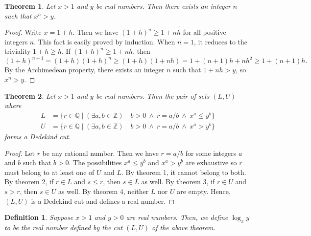 \documentclass[12pt]{article}
\newtheorem{dfn}{Definition}
\newtheorem{thm}{Theorem}
\begin{document}
\begin{thm}
Let $x>1$ and $y$ be real numbers.
Then there exists an integer $n$ such that $x^n > y$.
\end{thm}

\begin{proof}
Write $x = 1 + h$.  Then we have $(1 + h)^n \ge 1 + n h$ for all
positive integers $n$.  This fact is easily proved by induction.
When $n = 1$, it reduces to the triviality $1 + h \ge h$.  If
$(1 + h)^n \ge 1 + n h$, then
\[
(1 + h)^{n+1} = (1 + h) (1 + h)^n \ge (1 + h) (1 + n h) =
1 + (n+1) h + n h^2 \ge 1 + (n+1) h.
\]
By the Archimedean property, there exists an integer $n$ such
that $1 + nh > y$, so $x^n > y$.
\end{proof}

\begin{thm}
Let $x>1$ and $y$ be real numbers. 
Then the pair of sets $(L,U)$ where
\begin{align}
L &= \{r \in \mathbb{Q} \mid (\exists a, b \in \mathbb{Z}) \quad
b > 0 ~\land~ r = a/b ~\land~ x^a \le y^b\} \\
U &= \{r \in \mathbb{Q} \mid (\exists a, b \in \mathbb{Z}) \quad
b > 0 ~\land~ r = a/b ~\land~ x^a > y^b\}
\end{align}
forms a Dedekind cut.
\end{thm}

\begin{proof}
Let $r$ be any rational number.  Then we have $r = a/b$ for some integers
$a$ and $b$ such that $b > 0$.  The possibilities $x^a \le y^b$ and
$x^a > y^b$ are exhaustive so $r$ must belong to at least one of $U$ and
$L$.  By theorem 1, it cannot belong to both.  By theorem 2, if $r \in L$
and $s \le r$, then $s \in L$ as well.  By theorem 3, if $r \in U$
and $s > r$, then $s \in U$ as well.  By theorem 4, neither $L$ nor $U$
are empty.  Hence, $(L,U)$ is a Dedekind cut and defines a
real number.
\end{proof}

\begin{dfn}
Suppose $x>1$ and $y>0$ are real numbers.   Then,
we define $\log_x y$ to be the real number defined by the cut $(L,U)$ of
the above theorem.
\end{dfn}
\end{document}
